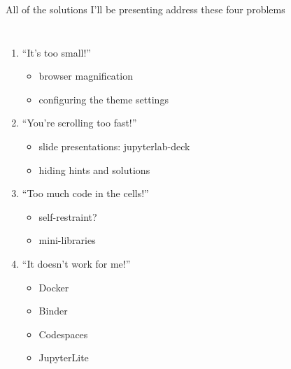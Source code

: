 \documentclass[aspectratio=169]{beamer}
\begin{document}
\begin{frame}{All of the solutions I'll be presenting address these four problems}
\Large
\vspace{0.5 cm}
\begin{columns}
\begin{enumerate}\setlength{\itemsep}{0.35 cm}
\item ``It's too small!''
\begin{itemize}
\item<2-> browser magnification
\item<2-> configuring the theme settings
\end{itemize}

\item ``You're scrolling too fast!''
\begin{itemize}
\item<2-> slide presentations: jupyterlab-deck
\item<2-> hiding hints and solutions
\end{itemize}

\item ``Too much code in the cells!''
\begin{itemize}
\item<2-> self-restraint?
\item<2-> mini-libraries
\end{itemize}

\item ``It doesn't work for me!''
\begin{itemize}
\item<2-> Docker
\item<2-> Binder
\item<2-> Codespaces
\item<2-> JupyterLite
\end{itemize}
\end{enumerate}
\end{columns}
\end{frame}
\end{document}
